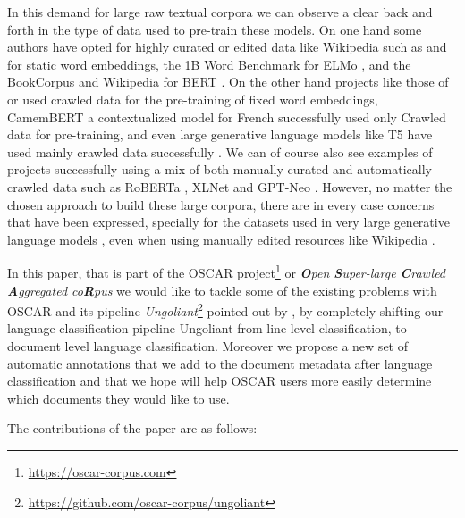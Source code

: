 In this demand for large raw textual corpora we can observe a clear back and forth in the type of data used to pre-train these models. On one hand some authors have opted for highly curated or edited data like Wikipedia such as  and  for static word embeddings, the 1B Word Benchmark \cite{chelba-etal-2014-one} for ELMo \cite{peters-etal-2018-deep}, and the BookCorpus \cite{zhu-etal-2015-aligning} and Wikipedia for BERT \cite{devlin-etal-2019-bert}. On the other hand projects like those of  or  used crawled data for the pre-training of fixed word embeddings, CamemBERT \cite{martin-etal-2020-camembert} a contextualized model for French successfully used only Crawled data for pre-training, and even large generative language models like T5 have used mainly crawled data successfully \cite{raffel-etal-2020-exploring}. We can of course also see examples of projects successfully using a mix of both manually curated and automatically crawled data such as RoBERTa \cite{liu-etal-2019-roberta}, XLNet \cite{yang-etal-2019-xlnet} and GPT-Neo \cite{black-etal-2021-gpt,gao-etal-2020-pile}. However, no matter the chosen approach to build these large corpora, there are in every case concerns that have been expressed, specially for the datasets used in very large generative language models \cite{bender-etal-2021-on}, even when using manually edited resources like Wikipedia \cite{barera-2020-mind}.

In this paper, that is part of the OSCAR project\footnote{\url{https://oscar-corpus.com}} or \emph{\textbf{O}pen \textbf{S}uper-large \textbf{C}rawled \textbf{A}ggregated co\textbf{R}pus} \cite{ortiz-suarez-etal-2019-asynchronous,ortiz-suarez-etal-2020-monolingual,abadji-etal-2021-ungoliant} we would like to tackle some of the existing problems with OSCAR and its pipeline \emph{Ungoliant}\footnote{\url{https://github.com/oscar-corpus/ungoliant}} pointed out by , by completely shifting our language classification pipeline Ungoliant from line level classification, to document level language classification. Moreover we propose a new set of automatic annotations that we add to the document metadata after language classification and that we hope will help OSCAR users more easily determine which documents they would like to use.

The contributions of the paper are as follows:

